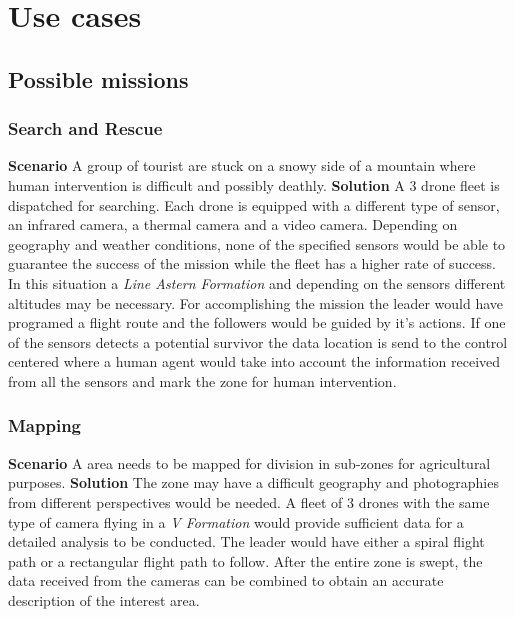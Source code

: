 \chapter{Use cases}
\label{chapter:use cases}
\section{Possible missions}
\subsection{Search and Rescue}

\textbf{Scenario} \newline
A group of tourist are stuck on a snowy side of a mountain where human intervention
is difficult and possibly deathly.
\textbf{Solution} \newline
A 3 drone fleet is dispatched for searching. Each drone is equipped with a different
type of sensor, an infrared camera, a thermal camera and a video camera. Depending
on geography and weather conditions, none of the specified sensors would be able
to guarantee the success of the mission while the fleet has a higher rate of success.
In this situation a \textit{Line Astern Formation} and depending on the sensors
different altitudes may be necessary. For accomplishing the mission the leader
would have programed a flight route and the followers would be guided by it's
actions. If one of the sensors detects a potential survivor the data location
is send to the control centered where a human agent would take into account
the information received from all the sensors and mark the zone for human 
intervention.

\subsection{Mapping}
\textbf{Scenario} \newline
A area needs to be mapped for division in sub-zones for agricultural purposes.
\textbf{Solution} \newline
The zone may have a difficult geography and photographies from different
perspectives would be needed. A fleet of 3 drones with the same type of camera
flying in a \textit{V Formation} would provide sufficient data for a detailed 
analysis to be conducted. The leader would have either a spiral flight path 
or a rectangular flight path to follow. After the entire zone is swept, the data
received from the cameras can be combined to obtain an accurate description
of the interest area.

